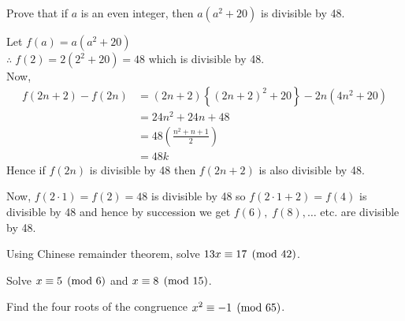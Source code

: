 \documentclass[12pt]{book}
\begin{document}
\begin{qn}
    Prove that if $ a $ is an even integer, then $ a(a^2+20) $ is divisible by 48.
\end{qn}
\begin{soln}
    Let $ f(a)=a(a^2+20) $\\
    $ \therefore\; f(2)=2(2^2+20)=48 $ which is divisible by 48.\\
    Now,
    \begin{align*}
        f(2n+2)-f(2n)&=(2n+2)\left\{ (2n+2)^2+20 \right\}-2n\left( 4n^2+20 \right)\\
        &=24n^2+24n+48\\
        &=48\left( \frac{n^2+n+1}{2}\right)\\
        &=48k
    \end{align*}
    Hence if $ f(2n) $ is divisible by 48 then $ f(2n+2) $ is also divisible by 48.

    Now, $ f(2\cdot1) =f(2)=48$ is divisible by 48 so $ f(2\cdot1+2)=f(4) $ is divisible by 48 and hence by succession we get $ f(6),\;f(8),\dots $ etc. are divisible by 48.
\end{soln}
\begin{qn}
    Using Chinese remainder theorem, solve $ 13x\equiv 17 \pmod{42} $.
\end{qn}
\begin{qn}
    Solve $ x\equiv 5 \pmod{6} $ and $ x\equiv 8 \pmod{15} $.
\end{qn}
\begin{qn}
    Find the four roots of the congruence $ x^2\equiv -1 \pmod{65} $.
\end{qn}
\end{document}
